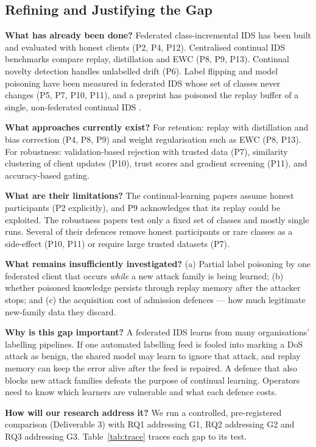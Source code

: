 \documentclass[10pt,a4paper]{article}
\begin{document}
\subsection{Refining and Justifying the Gap}
\textbf{What has already been done?} Federated class-incremental IDS has been built and evaluated with honest clients (P2, P4, P12). Centralised continual IDS benchmarks compare replay, distillation and EWC (P8, P9, P13). Continual novelty detection handles unlabelled drift (P6). Label flipping and model poisoning have been measured in federated IDS whose set of classes never changes (P5, P7, P10, P11), and a preprint has poisoned the replay buffer of a single, non-federated continual IDS \cite{replaypoison}.

\textbf{What approaches currently exist?} For retention: replay with distillation and bias correction (P4, P8, P9) and weight regularisation such as EWC (P8, P13). For robustness: validation-based rejection with trusted data (P7), similarity clustering of client updates (P10), trust scores and gradient screening (P11), and accuracy-based gating.

\textbf{What are their limitations?} The continual-learning papers assume honest participants (P2 explicitly), and P9 acknowledges that its replay could be exploited. The robustness papers test only a fixed set of classes and mostly single runs. Several of their defences remove honest participants or rare classes as a side-effect (P10, P11) or require large trusted datasets (P7).

\textbf{What remains insufficiently investigated?} (a) Partial label poisoning by one federated client that occurs \emph{while} a new attack family is being learned; (b) whether poisoned knowledge persists through replay memory after the attacker stops; and (c) the acquisition cost of admission defences --- how much legitimate new-family data they discard.

\textbf{Why is this gap important?} A federated IDS learns from many organisations' labelling pipelines. If one automated labelling feed is fooled into marking a DoS attack as benign, the shared model may learn to ignore that attack, and replay memory can keep the error alive after the feed is repaired. A defence that also blocks new attack families defeats the purpose of continual learning. Operators need to know which learners are vulnerable and what each defence costs.

\textbf{How will our research address it?} We run a controlled, pre-registered comparison (Deliverable 3) with RQ1 addressing G1, RQ2 addressing G2 and RQ3 addressing G3. Table~\ref{tab:trace} traces each gap to its test.
\end{document}
